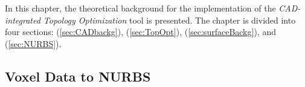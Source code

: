In this chapter, the theoretical background for the implementation of the \textit{CAD-integrated Topology Optimization} tool is presented. The chapter is divided into four sections: \emph{} (\autoref{sec:CADbackg}), \emph{} (\autoref{sec:TopOpt}), \emph{} (\autoref{sec:surfaceBackg}), and \emph{} (\autoref{sec:NURBS}).





%



\subsection{Voxel Data to NURBS}
% 





